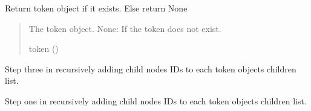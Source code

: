 \documentclass[letterpaper,10pt,english]{sphinxmanual}
\begin{document}
\begin{fulllineitems}
\begin{fulllineitems}
\end{fulllineitems}


\begin{fulllineitems}
\label{\detokenize{nodes:nodes.nodeBuilder.Build_children.get_object}}
\pysigstartsignatures
\pysiglinewithargsret
{}
{}
{}
\pysigstopsignatures
\sphinxAtStartPar
Return token object if it exists. Else return None
\begin{quote}\begin{description}
\sphinxAtStartPar
The token object.
None: If the token does not exist.

\sphinxAtStartPar
token ({\hyperref[\detokenize{nodes:nodes.nodeBuilder.Token}]{}})

\end{description}\end{quote}

\end{fulllineitems}


\begin{fulllineitems}
\label{\detokenize{nodes:nodes.nodeBuilder.Build_children.get_po_children}}
\pysigstartsignatures
\pysiglinewithargsret
{}
{\sphinxparamcomma {}}
{}
\pysigstopsignatures
\sphinxAtStartPar
Step three in recursively adding child nodes IDs to each token objects children list.

\end{fulllineitems}


\begin{fulllineitems}
\label{\detokenize{nodes:nodes.nodeBuilder.Build_children.get_prop_children}}
\pysigstartsignatures
\pysiglinewithargsret
{}
{}
{}
\pysigstopsignatures
\sphinxAtStartPar
Step one in recursively adding child nodes IDs to each token objects children list.


\end{fulllineitems}
\end{fulllineitems}
\end{document}
